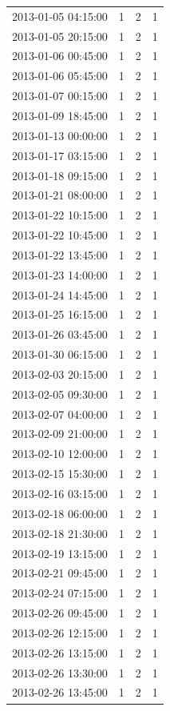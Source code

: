 \begin{tabular}{lrrr}
2013-01-05 04:15:00 & 1 & 2 & 1 \\
2013-01-05 20:15:00 & 1 & 2 & 1 \\
2013-01-06 00:45:00 & 1 & 2 & 1 \\
2013-01-06 05:45:00 & 1 & 2 & 1 \\
2013-01-07 00:15:00 & 1 & 2 & 1 \\
2013-01-09 18:45:00 & 1 & 2 & 1 \\
2013-01-13 00:00:00 & 1 & 2 & 1 \\
2013-01-17 03:15:00 & 1 & 2 & 1 \\
2013-01-18 09:15:00 & 1 & 2 & 1 \\
2013-01-21 08:00:00 & 1 & 2 & 1 \\
2013-01-22 10:15:00 & 1 & 2 & 1 \\
2013-01-22 10:45:00 & 1 & 2 & 1 \\
2013-01-22 13:45:00 & 1 & 2 & 1 \\
2013-01-23 14:00:00 & 1 & 2 & 1 \\
2013-01-24 14:45:00 & 1 & 2 & 1 \\
2013-01-25 16:15:00 & 1 & 2 & 1 \\
2013-01-26 03:45:00 & 1 & 2 & 1 \\
2013-01-30 06:15:00 & 1 & 2 & 1 \\
2013-02-03 20:15:00 & 1 & 2 & 1 \\
2013-02-05 09:30:00 & 1 & 2 & 1 \\
2013-02-07 04:00:00 & 1 & 2 & 1 \\
2013-02-09 21:00:00 & 1 & 2 & 1 \\
2013-02-10 12:00:00 & 1 & 2 & 1 \\
2013-02-15 15:30:00 & 1 & 2 & 1 \\
2013-02-16 03:15:00 & 1 & 2 & 1 \\
2013-02-18 06:00:00 & 1 & 2 & 1 \\
2013-02-18 21:30:00 & 1 & 2 & 1 \\
2013-02-19 13:15:00 & 1 & 2 & 1 \\
2013-02-21 09:45:00 & 1 & 2 & 1 \\
2013-02-24 07:15:00 & 1 & 2 & 1 \\
2013-02-26 09:45:00 & 1 & 2 & 1 \\
2013-02-26 12:15:00 & 1 & 2 & 1 \\
2013-02-26 13:15:00 & 1 & 2 & 1 \\
2013-02-26 13:30:00 & 1 & 2 & 1 \\
2013-02-26 13:45:00 & 1 & 2 & 1 \\

\end{tabular}

